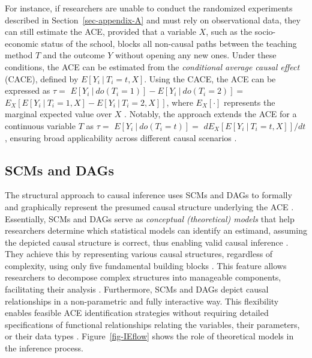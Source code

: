 \documentclass[
  authoryear,
  review,
  1p]{elsarticle}
\begin{document}
For instance, if researchers are unable to conduct the randomized
experiments described in Section~\ref{sec-appendix-A} and must rely on
observational data, they can still estimate the ACE, provided that a
variable \(X\), such as the socio-economic status of the school, blocks
all non-causal paths between the teaching method \(T\) and the outcome
\(Y\) without opening any new ones. Under these conditions, the ACE can
be estimated from the \emph{conditional average causal effect} (CACE),
defined by \(E[Y_{i} \: | \: T_{i}=t, X]\). Using the CACE, the ACE can
be expressed as \(\tau =\)
\(E[Y_{i} \: | \: do(T_{i}=1)] - E[Y_{i} \: | \: do(T_{i}=2)] =\)
\(E_{X}\left[ E[Y_{i} \: | \: T_{i}=1, X] - E[Y_{i} \: | \: T_{i}=2, X] \right]\),
where \(E_{X}[\cdot]\) represents the marginal expected value over \(X\)
\citep{Morgan_et_al_2014}. Notably, the approach extends the ACE for a
continuous variable \(T\) as \(\tau =\)
\(E[Y_{i} \: | \: do(T_{i}=t)] =\)
\(d E_{X}\left[ E[Y_{i} \: | \: T_{i}=t, X]\right]/ dt\), ensuring broad
applicability across different causal scenarios
\citep[pp.~45]{Neal_2020}.

\subsection{SCMs and DAGs}\label{sec-appendix-C}

\newcommand{\dsep}{\perp\!\!\!\perp}

The structural approach to causal inference uses SCMs and DAGs to
formally and graphically represent the presumed causal structure
underlying the ACE
\citep{Pearl_2009, Pearl_et_al_2016, Gross_et_al_2018, Neal_2020}.
Essentially, SCMs and DAGs serve as \emph{conceptual (theoretical)
models} that help researchers determine which statistical models can
identify an estimand, assuming the depicted causal structure is correct,
thus enabling valid causal inference \citep{McElreath_2020}. They
achieve this by representing various causal structures, regardless of
complexity, using only five fundamental building blocks
\citep{Neal_2020, McElreath_2020}. This feature allows researchers to
decompose complex structures into manageable components, facilitating
their analysis \citep{McElreath_2020}. Furthermore, SCMs and DAGs depict
causal relationships in a non-parametric and fully interactive way. This
flexibility enables feasible ACE identification strategies without
requiring detailed specifications of functional relationships relating
the variables, their parameters, or their data types
\citep{Pearl_et_al_2016}. Figure~\ref{fig-IEflow} shows the role of
theoretical models in the inference process.
\end{document}
